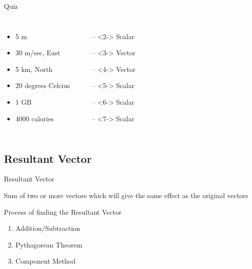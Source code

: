 \documentclass{beamer}
\begin{document}
\begin{frame}{Quiz}
		
		\begin{columns}
			\begin{itemize}
				\item 5 m
				\item 30 m/sec, East
				\item 5 km, North
				\item 20 degrees Celcius
				\item 1 GB
				\item 4000 calories
			\end{itemize}
			\begin{itemize}
				\item[--]<2-> Scalar
				\item[--]<3-> Vector
				\item[--]<4-> Vector
				\item[--]<5-> Scalar
				\item[--]<6-> Scalar
				\item[--]<7-> Scalar
			\end{itemize}
		\end{columns}
\end{frame}




\subsection{Resultant Vector}

\begin{frame}{Resultant Vector}
	
	\begin{definition}
		Sum of two or more vectors which will give the same effect as the original vectors
	\end{definition}
\end{frame}


\begin{frame}{Process of finding the Resultant Vector}
	
	\begin{enumerate}
		\item Addition/Subtraction
		\item Pythagorean Theorem
		\item Component Method
	\end{enumerate}
	
\end{frame}
\end{document}
